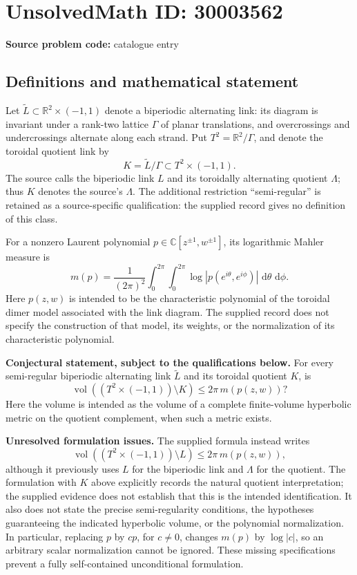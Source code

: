 \documentclass[11pt]{article}
\newcommand{\R}{\mathbb{R}}
\newcommand{\C}{\mathbb{C}}
\newcommand{\dd}{\,\mathrm{d}}
\begin{document}
\section*{UnsolvedMath ID: 30003562}
\textbf{Source problem code:} catalogue entry
\subsection{Definitions and mathematical statement}
Let \(\widetilde L\subset\R^2\times(-1,1)\) denote a biperiodic alternating link: its diagram is invariant under a rank-two lattice \(\Gamma\) of planar translations, and overcrossings and undercrossings alternate along each strand. Put \(T^2=\R^2/\Gamma\), and denote the toroidal quotient link by
\[
K=\widetilde L/\Gamma\subset T^2\times(-1,1).
\]
The source calls the biperiodic link \(L\) and its toroidally alternating quotient \(\Lambda\); thus \(K\) denotes the source's \(\Lambda\). The additional restriction ``semi-regular'' is retained as a source-specific qualification: the supplied record gives no definition of this class.

For a nonzero Laurent polynomial \(p\in\C[z^{\pm1},w^{\pm1}]\), its logarithmic Mahler measure is
\[
m(p)=\frac{1}{(2\pi)^2}\int_0^{2\pi}\int_0^{2\pi}
\log\left|p(e^{i\theta},e^{i\phi})\right|\,\dd\theta\,\dd\phi.
\]
Here \(p(z,w)\) is intended to be the characteristic polynomial of the toroidal dimer model associated with the link diagram. The supplied record does not specify the construction of that model, its weights, or the normalization of its characteristic polynomial.

\textbf{Conjectural statement, subject to the qualifications below.} For every semi-regular biperiodic alternating link \(\widetilde L\) and its toroidal quotient \(K\), is
\[
\operatorname{vol}\!\left((T^2\times(-1,1))\setminus K\right)
\leq 2\pi\,m(p(z,w))?
\]
Here the volume is intended as the volume of a complete finite-volume hyperbolic metric on the quotient complement, when such a metric exists.

\textbf{Unresolved formulation issues.} The supplied formula instead writes
\[
\operatorname{vol}\!\left((T^2\times(-1,1))\setminus L\right)
\leq 2\pi\,m(p(z,w)),
\]
although it previously uses \(L\) for the biperiodic link and \(\Lambda\) for the quotient. The formulation with \(K\) above explicitly records the natural quotient interpretation; the supplied evidence does not establish that this is the intended identification. It also does not state the precise semi-regularity conditions, the hypotheses guaranteeing the indicated hyperbolic volume, or the polynomial normalization. In particular, replacing \(p\) by \(cp\), for \(c\ne0\), changes \(m(p)\) by \(\log|c|\), so an arbitrary scalar normalization cannot be ignored. These missing specifications prevent a fully self-contained unconditional formulation.
\end{document}
